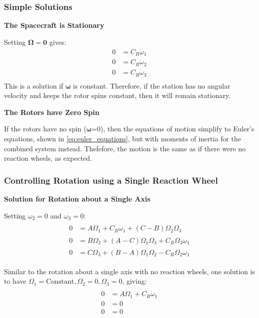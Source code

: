 \documentclass[12]{article}
\begin{document}
\begin{multicols*}{2}
\subsubsection{Simple Solutions}

\textbf{The Spacecraft is Stationary}

Setting $\bm{\Omega} = \bm{0}$ gives:
\begin{align*}
0 &= C_R\dot{\omega}_1 \\
0 &= C_R\dot{\omega}_2 \\
0 &= C_R\dot{\omega}_3 \\
\end{align*}
This is a solution if $\bm{\omega}$ is constant. Therefore, if the station has no angular velocity and keeps the rotor spins constant, then it will remain stationary.

\textbf{The Rotors have Zero Spin}

If the rotors have no spin ($\bm{\omega}$=0), then the equations of motion simplify to Euler's equations, shown in \cref{eq:euler_equations}, but with moments of inertia for the combined system instead. Thefefore, the motion is the same as if there were no reaction wheels, as expected.

\subsubsection{Controlling Rotation using a Single Reaction Wheel}

\textbf{Solution for Rotation about a Single Axis}

Setting $\omega_2=0$ and $\omega_3=0$:
\begin{align} \label{eq:reaction_wheel_single_gyro_full}
\begin{split}
0 &= A\dot{\Omega}_1 + C_R\dot{\omega}_1 + (C - B)\Omega_2\Omega_3 \\
0 &= B\dot{\Omega}_2 + (A - C)\Omega_1\Omega_3
+ C_R\Omega_3\omega_1 \\
0 &= C\dot{\Omega}_3 + (B - A)\Omega_1\Omega_2
- C_R\Omega_2\omega_1
\end{split}
\end{align}

Similar to the rotation about a single axis with no reaction wheels, one solution is to have $\Omega_1 = \textrm{Constant}, \Omega_2=0, \Omega_3=0$, giving: 
\begin{align} \label{eq:reaction_wheel_single_gyro_simplified}
\begin{split}
0 &= A\dot{\Omega}_1 + C_R\dot{\omega}_1 \\
0 &= 0 \\
0 &= 0
\end{split}
\end{align}


\end{multicols*}
\end{document}

